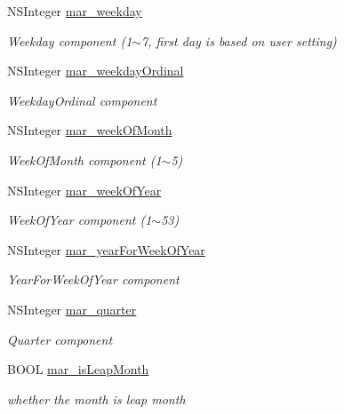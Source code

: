 \begin{Indent}
\begin{DoxyCompactItemize}
N\+S\+Integer \hyperlink{category_n_s_date_07_m_a_r_e_x_08_aaf7a4349804d8f7753e5eb1f1102a1ed}{mar\+\_\+weekday}
\begin{DoxyCompactList}\small\item\em Weekday component (1$\sim$7, first day is based on user setting) \end{DoxyCompactList}\item 
N\+S\+Integer \hyperlink{category_n_s_date_07_m_a_r_e_x_08_aeb98153fd17d7ecaec0393e98e3854f5}{mar\+\_\+weekday\+Ordinal}
\begin{DoxyCompactList}\small\item\em Weekday\+Ordinal component \end{DoxyCompactList}\item 
N\+S\+Integer \hyperlink{category_n_s_date_07_m_a_r_e_x_08_a54fc5cfda04ab17ad249734da8530754}{mar\+\_\+week\+Of\+Month}
\begin{DoxyCompactList}\small\item\em Week\+Of\+Month component (1$\sim$5) \end{DoxyCompactList}\item 
N\+S\+Integer \hyperlink{category_n_s_date_07_m_a_r_e_x_08_af6778703d50bc63f983c45227990b6a3}{mar\+\_\+week\+Of\+Year}
\begin{DoxyCompactList}\small\item\em Week\+Of\+Year component (1$\sim$53) \end{DoxyCompactList}\item 
N\+S\+Integer \hyperlink{category_n_s_date_07_m_a_r_e_x_08_a87e7ddbe473e203254659abdceee4553}{mar\+\_\+year\+For\+Week\+Of\+Year}
\begin{DoxyCompactList}\small\item\em Year\+For\+Week\+Of\+Year component \end{DoxyCompactList}\item 
N\+S\+Integer \hyperlink{category_n_s_date_07_m_a_r_e_x_08_a76478fccc525770f5d1fb7c6187eefdc}{mar\+\_\+quarter}
\begin{DoxyCompactList}\small\item\em Quarter component \end{DoxyCompactList}\item 
B\+O\+OL \hyperlink{category_n_s_date_07_m_a_r_e_x_08_adcd41cb478d33d7f4a86d94355e66f4f}{mar\+\_\+is\+Leap\+Month}
\begin{DoxyCompactList}\small\item\em whether the month is leap month \end{DoxyCompactList}\item 

\end{DoxyCompactItemize}
\end{Indent}
